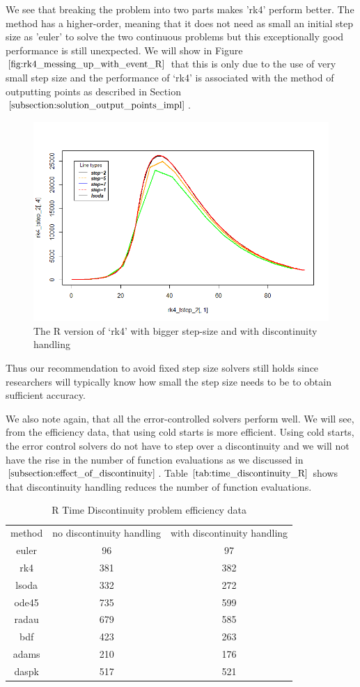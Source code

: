 We see that breaking the problem into two parts makes 'rk4' perform better. The method has a higher-order, meaning that it does not need as small an initial step size as 'euler' to solve the two continuous problems but this exceptionally good performance is still unexpected. We will show in Figure $\ref{fig:rk4_messing_up_with_event_R}$ that this is only due to the use of very small step size and the performance of `rk4' is associated with the method of outputting points as described in Section $\ref{subsection:solution_output_points_impl}$.

\begin{figure}[h]
\centering
\includegraphics[width=0.7\linewidth]{./figures/rk4_messing_up_with_event_R}
\caption{The R version of `rk4' with bigger step-size and with discontinuity handling}
\label{fig:rk4_messing_up_with_event_R}
\end{figure}

Thus our recommendation to avoid fixed step size solvers still holds since researchers will typically know how small the step size needs to be to obtain sufficient accuracy.

We also note again, that all the error-controlled solvers perform well. We will see, from the efficiency data, that using cold starts is more efficient. Using cold starts, the error control solvers do not have to step over a discontinuity and we will not have the rise in the number of function evaluations as we discussed in $\ref{subsection:effect_of_discontinuity}$. Table $\ref{tab:time_discontinuity_R}$ shows that discontinuity handling reduces the number of function evaluations. 

\begin{table}[h]
\caption {R Time Discontinuity problem efficiency data} \label{tab:time_discontinuity_R}
\begin{center}
\begin{tabular}{ c c c } 
method & no discontinuity handling & with discontinuity handling \\ 
euler & 96 & 97 \\
rk4 & 381 & 382 \\ 
lsoda & 332 & 272 \\
ode45 & 735 & 599 \\
radau & 679 & 585 \\
bdf & 423 & 263 \\
adams & 210 & 176 \\
daspk & 517 & 521
\end{tabular}
\end{center}
\end{table}

